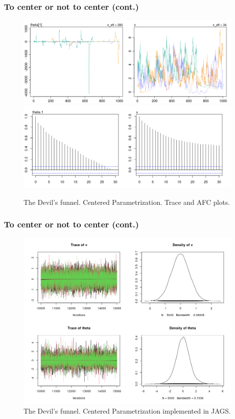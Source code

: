\documentclass[arial,12pt,xcolor=dvipsnames]{beamer}
\begin{document}
%
\begin{frame}
	\frametitle{To center or not to center (cont.)}
	\begin{figure}[h] 
		\centering
			\includegraphics[width=.70\linewidth]{1_trace_CE_simple}
			\includegraphics[width=.73\linewidth]{1_acf_CE_simple}
		\caption{The Devil's funnel. Centered Parametrization. Trace and AFC plots.}
		\label{fig:devil_CE}
	\end{figure}
\end{frame}
%
\begin{frame}
	\frametitle{To center or not to center (cont.)}
	\begin{figure}[H]
		\centering
		\includegraphics[width=0.7\linewidth]{1_jags_CE_simple}
		\caption{The Devil's funnel. Centered Parametrization implemented in JAGS.}
		\label{fig:devil_CE_simple_jags}
	\end{figure}
\end{frame}
\end{document}
